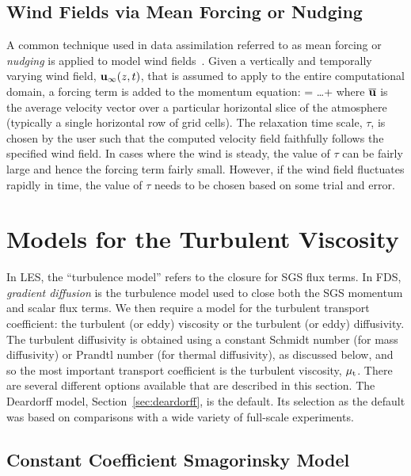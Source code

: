\subsection{Wind Fields via Mean Forcing or Nudging}

A common technique used in data assimilation referred to as mean forcing or {\em nudging} is applied to model wind fields~\cite{Kalnay:2003}. Given a vertically and temporally varying wind field, ${\mathbf{u}}_\infty(z,t)$, that is assumed to apply to the entire computational domain, a forcing term is added to the momentum equation:
\be
    = \ldots + \frac{\bu_\infty - \overline{\bu}}{\tau}
\ee
where $\overline{{\mathbf{u}}}$ is the average velocity vector over a particular horizontal slice of the atmosphere (typically a single horizontal row of grid cells). The relaxation time scale, $\tau$, is chosen by the user such that the computed velocity field faithfully follows the specified wind field. In cases where the wind is steady, the value of $\tau$ can be fairly large and hence the forcing term fairly small. However, if the wind field fluctuates rapidly in time, the value of $\tau$ needs to be chosen based on some trial and error.

\newpage
\section{Models for the Turbulent Viscosity}
\label{section:turbulent_viscosity}

In LES, the ``turbulence model'' refers to the closure for SGS flux terms.  In FDS, \emph{gradient diffusion} is the turbulence model used to close both the SGS momentum and scalar flux terms.  We then require a model for the turbulent transport coefficient: the turbulent (or eddy) viscosity or the turbulent (or eddy) diffusivity.  The turbulent diffusivity is obtained using a constant Schmidt number (for mass diffusivity) or Prandtl number (for thermal diffusivity), as discussed below, and so the most important transport coefficient is the turbulent viscosity, $\mu_{\rm t}$. There are several different options available that are described in this section. The Deardorff model, Section~\ref{sec:deardorff}, is the default. Its selection as the default was based on comparisons with a wide variety of full-scale experiments.

\subsection{Constant Coefficient Smagorinsky Model}


